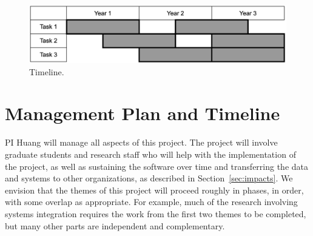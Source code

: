 \begin{figure}[t]
    \centering
    \includegraphics[width=0.5\linewidth]{figures/timeline.png}
    \caption{Timeline.}
    \label{fig:timeline}
\end{figure}


\section{Management Plan and Timeline}\label{sec:management}

PI Huang will manage all aspects of this project. The project will involve
graduate students and research staff who will help with the implementation of
the project, as well as sustaining the software over time and transferring the
data and systems to other organizations, as described in
Section~\ref{sec:impacts}. We envision that the themes of this project will
proceed roughly in phases, in order, with some overlap as appropriate. For
example, much of the research involving systems integration requires the work
from the first two themes to be completed, but many other parts are
independent and complementary.


